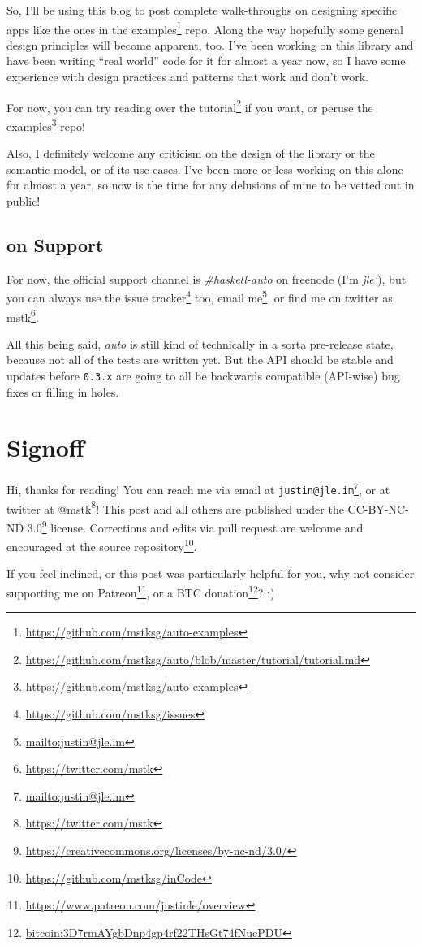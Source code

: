\documentclass[]{article}
\renewcommand{\href}[2]{#2\footnote{\url{#1}}}
\begin{document}
So, I'll be using this blog to post complete walk-throughs on designing specific
apps like the ones in the
\href{https://github.com/mstksg/auto-examples}{examples} repo. Along the way
hopefully some general design principles will become apparent, too. I've been
working on this library and have been writing ``real world'' code for it for
almost a year now, so I have some experience with design practices and patterns
that work and don't work.

For now, you can try reading over the
\href{https://github.com/mstksg/auto/blob/master/tutorial/tutorial.md}{tutorial}
if you want, or peruse the
\href{https://github.com/mstksg/auto-examples}{examples} repo!

Also, I definitely welcome any criticism on the design of the library or the
semantic model, or of its use cases. I've been more or less working on this
alone for almost a year, so now is the time for any delusions of mine to be
vetted out in public!

\subsection{on Support}\label{on-support}

For now, the official support channel is \emph{\#haskell-auto} on freenode (I'm
\emph{jle`}), but you can always use the
\href{https://github.com/mstksg/issues}{issue tracker} too,
\href{mailto:justin@jle.im}{email me}, or find me on twitter as
\href{https://twitter.com/mstk}{mstk}.

All this being said, \emph{auto} is still kind of technically in a sorta
pre-release state, because not all of the tests are written yet. But the API
should be stable and updates before \texttt{0.3.x} are going to all be backwards
compatible (API-wise) bug fixes or filling in holes.

\section{Signoff}\label{signoff}

Hi, thanks for reading! You can reach me via email at
\href{mailto:justin@jle.im}{\nolinkurl{justin@jle.im}}, or at twitter at
\href{https://twitter.com/mstk}{@mstk}! This post and all others are published
under the \href{https://creativecommons.org/licenses/by-nc-nd/3.0/}{CC-BY-NC-ND
3.0} license. Corrections and edits via pull request are welcome and encouraged
at \href{https://github.com/mstksg/inCode}{the source repository}.

If you feel inclined, or this post was particularly helpful for you, why not
consider \href{https://www.patreon.com/justinle/overview}{supporting me on
Patreon}, or a \href{bitcoin:3D7rmAYgbDnp4gp4rf22THsGt74fNucPDU}{BTC donation}?
:)
\end{document}

